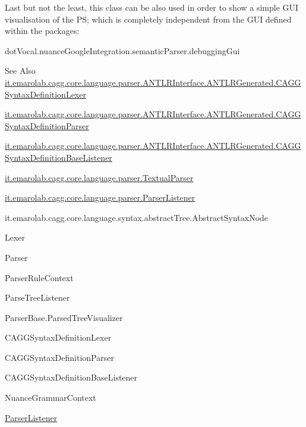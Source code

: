 Last but not the least, this class can be also used in order to show a simple G\-U\-I visualisation of the P\-S; which is completely independent from the G\-U\-I defined within the packages\-: 
\begin{DoxyCode}
dotVocal.nuanceGoogleIntegration.semanticParser.debuggingGui 
\end{DoxyCode}
 

\begin{DoxySeeAlso}{See Also}
\hyperlink{classit_1_1emarolab_1_1cagg_1_1core_1_1language_1_1parser_1_1ANTLRInterface_1_1ANTLRGenerated_1_1CAGGSyntaxDefinitionLexer}{it.\-emarolab.\-cagg.\-core.\-language.\-parser.\-A\-N\-T\-L\-R\-Interface.\-A\-N\-T\-L\-R\-Generated.\-C\-A\-G\-G\-Syntax\-Definition\-Lexer} 

\hyperlink{classit_1_1emarolab_1_1cagg_1_1core_1_1language_1_1parser_1_1ANTLRInterface_1_1ANTLRGenerated_1_1CAGGSyntaxDefinitionParser}{it.\-emarolab.\-cagg.\-core.\-language.\-parser.\-A\-N\-T\-L\-R\-Interface.\-A\-N\-T\-L\-R\-Generated.\-C\-A\-G\-G\-Syntax\-Definition\-Parser} 

\hyperlink{classit_1_1emarolab_1_1cagg_1_1core_1_1language_1_1parser_1_1ANTLRInterface_1_1ANTLRGenerated_1_1a45b55289931e185944c10a916c8cdd}{it.\-emarolab.\-cagg.\-core.\-language.\-parser.\-A\-N\-T\-L\-R\-Interface.\-A\-N\-T\-L\-R\-Generated.\-C\-A\-G\-G\-Syntax\-Definition\-Base\-Listener} 

\hyperlink{classit_1_1emarolab_1_1cagg_1_1core_1_1language_1_1parser_1_1TextualParser}{it.\-emarolab.\-cagg.\-core.\-language.\-parser.\-Textual\-Parser} 

\hyperlink{classit_1_1emarolab_1_1cagg_1_1core_1_1language_1_1parser_1_1ParserListener}{it.\-emarolab.\-cagg.\-core.\-language.\-parser.\-Parser\-Listener} 

it.\-emarolab.\-cagg.\-core.\-language.\-syntax.\-abstract\-Tree.\-Abstract\-Syntax\-Node 

Lexer 

Parser 

Parser\-Rule\-Context 

Parse\-Tree\-Listener 

Parser\-Base.\-Parsed\-Tree\-Visualizer 

C\-A\-G\-G\-Syntax\-Definition\-Lexer 

C\-A\-G\-G\-Syntax\-Definition\-Parser 

C\-A\-G\-G\-Syntax\-Definition\-Base\-Listener 

Nuance\-Grammar\-Context 

\hyperlink{classit_1_1emarolab_1_1cagg_1_1core_1_1language_1_1parser_1_1ParserListener}{Parser\-Listener}
\end{DoxySeeAlso}

